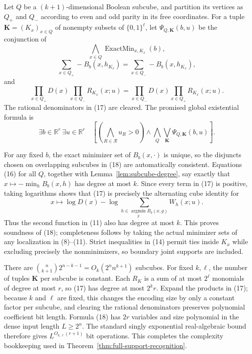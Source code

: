 \documentclass{article}
\newcommand{\bits}{\{0,1\}}
\begin{document}
Let $Q$ be a $(k+1)$-dimensional Boolean subcube, and partition its vertices
as $Q_+$ and $Q_-$ according to even and odd parity in its free coordinates.
For a tuple $\mathbf K=(K_x)_{x\in Q}$ of nonempty subsets of $\bits^\ell$,
let $\Psi_{Q,\mathbf K}(b,u)$ be the conjunction of
\[
  \bigwedge_{x\in Q}\operatorname{ExactMin}_{x,K_x}(b),
  \tag{15}
\]
\[
  \sum_{x\in Q_+}-B_b(x,h_{K_x})
  =
  \sum_{x\in Q_-}-B_b(x,h_{K_x}),
  \tag{16}
\]
and
\[
  \prod_{x\in Q_+}D(x)
  \prod_{x\in Q_-}R_{K_x}(x;u)
  =
  \prod_{x\in Q_-}D(x)
  \prod_{x\in Q_+}R_{K_x}(x;u).
  \tag{17}
\]
The rational denominators in (17) are cleared.  The promised global
existential formula is
\[
  \exists b\in\mathbb R^r\ \exists u\in\mathbb R^r\quad
  \left[
    \left(\bigwedge_{R\in\mathcal R}u_R>0\right)
    \wedge
    \bigwedge_Q
    \bigvee_{\mathbf K}
    \Psi_{Q,\mathbf K}(b,u)
  \right].
  \tag{18}
\]

For any fixed $b$, the exact minimizer set of $B_b(x,\cdot)$ is unique, so the
disjuncts chosen on overlapping subcubes in (18) are automatically
consistent.  Equations (16) for all $Q$, together with
Lemma~\ref{lem:subcube-degree}, say exactly that
$x\mapsto-\min_hB_b(x,h)$ has degree at most $k$.  Since every term in (17)
is positive, taking logarithms shows that (17) is precisely the alternating
cube identity for
\[
  x\longmapsto \log D(x)-
  \log\sum_{h\in\operatorname*{argmin}_gB_b(x,g)}W_h(x;u).
\]
Thus the second function in (11) also has degree at most $k$.  This proves
soundness of (18); completeness follows by taking the actual minimizer sets
of any localization in (8)--(11).  Strict inequalities in (14) permit ties
inside $K_x$ while excluding precisely the nonminimizers, so boundary joint
supports are included.

There are
$\binom{n}{k+1}2^{n-k-1}=O_k(2^nn^{k+1})$ subcubes.  For fixed $k,\ell$, the
number of tuples $\mathbf K$ per subcube is constant.  Each $R_K$ is a sum of
at most $2^\ell$ monomials of degree at most $r$, so (17) has degree at most
$2^kr$.  Expand the products in (17); because $k$ and $\ell$ are fixed, this
changes the encoding size by only a constant factor per subcube, and clearing
the rational denominators preserves polynomial coefficient bit length.
Formula (18) has $2r$ variables and size polynomial in the dense input length
$L\ge2^n$.  The standard singly exponential real-algebraic bound therefore
gives $L^{O_{k,\ell}(r+1)}$ bit operations.  This completes the complexity
bookkeeping used in
Theorem~\ref{thm:full-support-recognition}.
\end{document}
